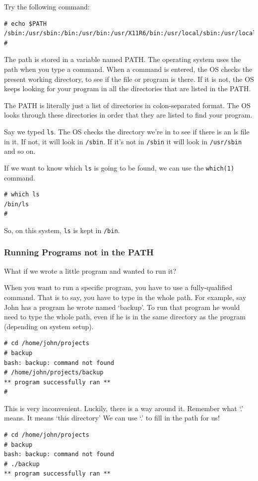 Try the following command:
{\tt \begin{verbatim}
# echo $PATH                                                                            
/sbin:/usr/sbin:/bin:/usr/bin:/usr/X11R6/bin:/usr/local/sbin:/usr/local/bin
# 
\end{verbatim}
}

The path is stored in a variable named PATH. The operating system uses the path when you type a command.
When a command is entered, the OS checks the present working directory, to see if the file or program is there.  
If it is not, the OS keeps looking for your program in all the directories that are listed in the PATH.

The PATH is literally just a list of directories in colon-separated format.  The OS looks through these directories
in order that they are listed to find your program.

Say we typed {\tt ls}.  The OS checks the directory we're in to see if there is an ls file in it. If not, it will look in {\tt /sbin}.
If it's not in {\tt /sbin} it will look in {\tt /usr/sbin} and so on.

If we want to know which {\tt ls} is going to be found, we can use the {\tt which(1)} command.
{\tt \begin{verbatim}
# which ls
/bin/ls
# 
\end{verbatim}
}
So, on this system, {\tt ls} is kept in {\tt /bin}.

\subsubsection{Running Programs not in the PATH}
What if we wrote a little program and wanted to run it?

When you want to run a specific program, you have to use a fully-qualified command. 
That is to say, you have to type in the whole path. For example, say John has a program he
wrote named `backup'. To run that program he would need to type the whole path, 
even if he is in the same directory as the program (depending on system setup).
{\tt \begin{verbatim}
# cd /home/john/projects
# backup
bash: backup: command not found
# /home/john/projects/backup
** program successfully ran **
#
\end{verbatim}
}
This is very inconvenient. Luckily, there is a way around it. Remember what `.' means.  It means `this directory'
We can use `.' to fill in the path for us!

{\tt \begin{verbatim}
# cd /home/john/projects
# backup
bash: backup: command not found
# ./backup
** program successfully ran **
\end{verbatim}
}

